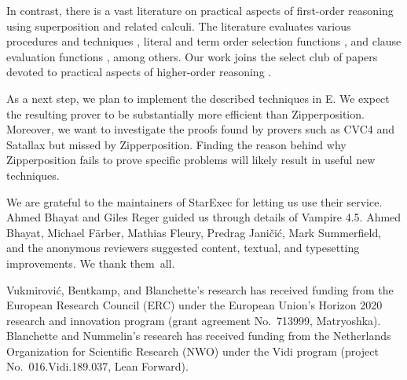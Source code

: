 \documentclass[smallcondensed,draft]{svjour3}     %
\begin{document}
In contrast, there is a vast literature on practical aspects of first-order
reasoning using superposition and related calculi.
The literature evaluates various procedures and techniques
\cite{hv-09-unifalgs,rsv-15-playing-with-avatar}, literal and term order selection
functions \cite{hrsv-16-selsel}, and clause evaluation functions
\cite{sm-2016-clausesel, gs-20-clausesel}, among others. Our work joins the
select club of papers devoted to practical aspects of higher-order
reasoning
\cite{sb-15-beta,wskb-16-effective-norm,fb-2016-internal-guidance-satallax,benzmueller-et-al-05-can-ho-fo-coop}.




As a next step, we plan to implement the described techniques in E.
We
expect the resulting prover to be substantially more efficient than
Zipperposition. Moreover, we want to investigate the proofs found by provers
such as CVC4 and Satallax but missed by Zipperposition. Finding the reason
behind why Zipperposition fails to prove specific problems will likely result in useful new techniques.


\def\ackname{Acknowledgment} %
\begin{acknowledgements}
We are grateful to the maintainers of StarExec for letting us use their service.
Ahmed Bhayat and Giles Reger guided us
through details of Vampire 4.5. Ahmed Bhayat, Michael F\"arber,
Mathias Fleury, Predrag Jani\v ci\'c,
Mark Summerfield, and the anonymous reviewers suggested content, textual, and
typesetting improvements. We thank them~all.

Vukmirovi\'c, Bentkamp, and Blanchette's research has received funding from
the European Research Council (ERC) under the European Union's Horizon 2020
research and innovation program (grant agreement No.\ 713999, Matry\-osh\-ka).
%
Blanchette and Nummelin's research has
received funding from the Netherlands Organization for Scientific Research (NWO)
under the Vidi program (project No.\ 016.Vidi.189.037, Lean Forward).
\end{acknowledgements}
\end{document}

